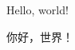 \documentclass[12pt, a4paper, oneside]{ctexart}
\begin{document}
Hello, world!

你好，世界！
\end{document}
